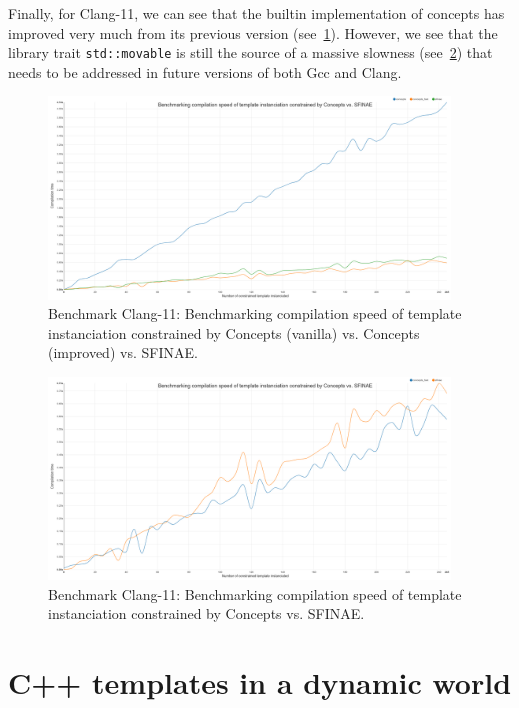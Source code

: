 Finally, for Clang-11, we can see that the builtin implementation of concepts has improved very much from its previous
version (see~\cref{fig.gen.bench.clang11.1.concept.sfinae}). However, we see that the library trait
\texttt{std::movable} is still the source of a massive slowness (see~\cref{fig.gen.bench.clang11.2.concept.sfinae}) that
needs to be addressed in future versions of both Gcc and Clang.

\begin{figure}[htb]
  \centering
  \includegraphics[width=4.2in]{figs/compile_time_benches/clang11/chart.concept.png}
  \caption{Benchmark Clang-11: Benchmarking compilation speed of template instanciation constrained by Concepts (vanilla) vs. Concepts (improved) vs. SFINAE.}
  \label{fig.gen.bench.clang11.1.concept.sfinae}
\end{figure}

\begin{figure}[htb]
  \centering
  \includegraphics[width=4.2in]{figs/compile_time_benches/clang11/chart.concept2.png}
  \caption{Benchmark Clang-11: Benchmarking compilation speed of template instanciation constrained by Concepts vs. SFINAE.}
  \label{fig.gen.bench.clang11.2.concept.sfinae}
\end{figure}


\section{C++ templates in a dynamic world}
\label{genericity.sec.template.dynworld}


